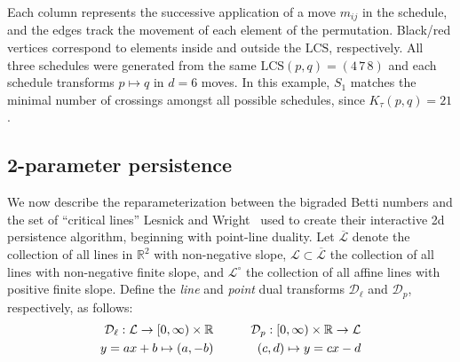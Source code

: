 \documentclass[sn-mathphys]{sn-jnl}
\begin{document}
Each column represents the successive application of a move $m_{ij}$ in the schedule, 
and the edges track the movement of each element of the permutation. 
Black/red vertices correspond to elements inside and outside the $\mathrm{LCS}$, respectively. 
All three schedules were generated from the same $\mathrm{LCS}(p,q) = (4\,7\,8)$ and each schedule transforms $p \mapsto q$ in $d = 6$ moves. 
In this example, $S_1$ matches the minimal number of crossings amongst all possible schedules,  since $K_\tau(p,q) = 21$. 



\subsection{2-parameter persistence}\label{app:2d_pers}\label{sec:fibered_barcode_reparam}
We now describe the reparameterization between the bigraded Betti numbers and the set of ``critical lines'' Lesnick and Wright~\cite{lesnick2012multidimensional} used to create their interactive 2d persistence algorithm, beginning with point-line duality.
Let $\overline{\mathcal{L}}$ denote the collection of all lines in $\mathbb{R}^2$ with non-negative slope, $\mathcal{L} \subset \overline{\mathcal{L}}$ the collection of all lines with non-negative finite slope, and $\mathcal{L}^\circ$ the collection of all affine lines with positive finite slope. 
Define the \emph{line} and \emph{point} dual transforms $\mathcal{D}_{\ell}$ and $\mathcal{D}_p$, respectively, as follows: 
\begin{equation}
	\begin{aligned}
\mathcal{D}_{\ell}: \mathcal{L} \rightarrow[0, \infty) \times \mathbb{R} & \quad \hfill \quad & \mathcal{D}_{p}:[0, \infty) \times \mathbb{R} \rightarrow \mathcal{L} \\
y=a x+b \mapsto(a,-b) &\quad \hfill \quad & (c, d) \mapsto y=c x-d
\end{aligned}
\end{equation}
\end{document}
